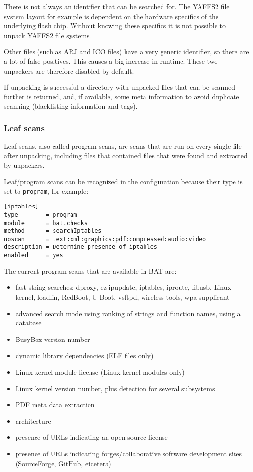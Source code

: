 \documentclass[10pt]{article}
\begin{document}
There is not always an identifier that can be searched for. The YAFFS2 file
system layout for example is dependent on the hardware specifics of the
underlying flash chip. Without knowing these specifics it is not possible to
unpack YAFFS2 file systems.

Other files (such as ARJ and ICO files) have a very generic identifier, so
there are a lot of false positives. This causes a big increase in runtime.
These two unpackers are therefore disabled by default.

If unpacking is successful a directory with unpacked files that can be
scanned further is returned, and, if available, some meta information to avoid
duplicate scanning (blacklisting information and tags).

\subsubsection{Leaf scans}

Leaf scans, also called program scans, are scans that are run on every single
file after unpacking, including files that contained files that were found
and extracted by unpackers.

Leaf/program scans can be recognized in the configuration because their type is
set to \texttt{program}, for example:

\begin{verbatim}
[iptables]
type        = program
module      = bat.checks
method      = searchIptables
noscan      = text:xml:graphics:pdf:compressed:audio:video
description = Determine presence of iptables
enabled     = yes
\end{verbatim}

The current program scans that are available in BAT are:

\begin{itemize}
\item fast string searches: dproxy, ez-ipupdate, iptables, iproute, libusb,
Linux kernel, loadlin, RedBoot, U-Boot, vsftpd, wireless-tools, wpa-supplicant
\item advanced search mode using ranking of strings and function names, using a
database
\item BusyBox version number
\item dynamic library dependencies (ELF files only)
\item Linux kernel module license (Linux kernel modules only)
\item Linux kernel version number, plus detection for several subsystems
\item PDF meta data extraction
\item architecture
\item presence of URLs indicating an open source license
\item presence of URLs indicating forges/collaborative software development
sites (SourceForge, GitHub, etcetera)
\end{itemize}
\end{document}

